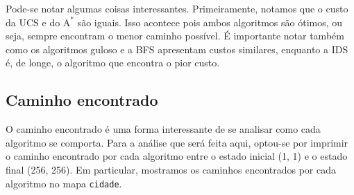 \documentclass{article}
\begin{document}
Pode-se notar algumas coisas interessantes. Primeiramente, notamos que o custo da UCS e do \(\text{A}^*\) são iguais. Isso acontece pois ambos algoritmos são ótimos, ou seja, sempre encontram o menor caminho possível.
É importante notar também como os algoritmos guloso e a BFS apresentam custos similares, enquanto a IDS é, de longe, o algoritmo que encontra o pior custo.

\subsection{Caminho encontrado}

O caminho encontrado é uma forma interessante de se analisar como cada algoritmo se comporta. Para a análise que será feita aqui, optou-se por imprimir o caminho encontrado por cada algoritmo entre o estado inicial
(1, 1) e o estado final (256, 256). Em particular, mostramos os caminhos encontrados por cada algoritmo no mapa \texttt{cidade}.

\begin{figure}[H]
		\centering
\end{figure}
\end{document}
